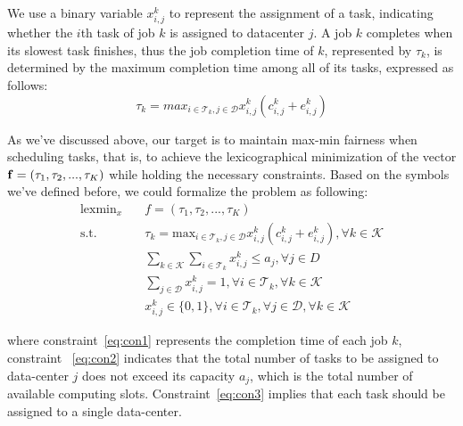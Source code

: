 \documentclass{llncs}
\begin{document}
We use a binary variable $x_{i,j}^k$ to represent the assignment of a task, indicating whether the $i$th task of job $k$ is assigned to datacenter $j$. A job $k$ completes when its slowest task finishes, thus the job completion time of $k$, represented by $\tau_k$, is determined by the maximum completion time among all of its tasks, expressed as follows:
\begin{equation*}
    \tau_k = max_{i \in \mathcal{T}_k, j \in \mathcal{D}} x_{i,j}^k(c_{i,j}^k+e_{i,j}^k)
\end{equation*}

As we've discussed above, our target is to maintain max-min fairness when scheduling tasks, that is, to achieve the lexicographical minimization of the vector $\bold{f}=(\tau_1,\tau_2,...,\tau_K)$ while holding the necessary constraints. Based on the symbols we've defined before, we could formalize the problem as following:
\begin{align}
    \mbox{lexmin}_x \quad &f=(\tau_1,\tau_2,...,\tau_K) \label{eq:target1}\\
\mbox{s.t.} \quad &\tau_k = \mbox{max}_{i \in \mathcal{T}_k, j \in \mathcal{D}} x_{i,j}^k(c_{i,j}^k+e_{i,j}^k), \forall k \in \mathcal{K} \label{eq:con1}\\
&\sum_{k \in \mathcal{K}} \sum_{i \in \mathcal{T}_k} x_{i,j}^k \leq a_j, \forall j \in D \label{eq:con2}\\
&\sum_{j \in \mathcal{D}} x_{i,j}^k = 1, \forall i \in \mathcal{T}_k, \forall k \in \mathcal{K} \label{eq:con3}\\
&x_{i,j}^k \in \{0,1\}, \forall i \in \mathcal{T}_k, \forall j \in \mathcal{D}, \forall k \in \mathcal{K} \label{eq:con4}
\end{align}
    
where constraint~\ref{eq:con1} represents the completion time of each job $k$, constraint ~\ref{eq:con2} indicates that the total number of tasks to be assigned to data-center $j$ does not exceed its capacity $a_j$, which is the total number of available computing slots. Constraint~\ref{eq:con3} implies that each task should be assigned to a single data-center.
\end{document}
